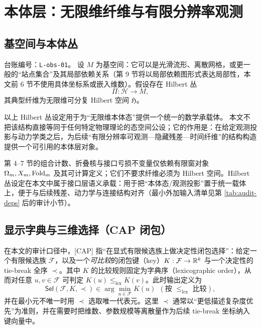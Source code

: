 \section{本体层：无限维纤维与有限分辨率观测}

\subsection{基空间与本体丛}

\begin{assumption}\label{ass:hilbert_bundle}
\InterfaceTag
\AuditTag 台账编号：\texttt{L-obs-01}。
设 $M$ 为基空间：它可以是光滑流形、离散网格，或更一般的“站点集合”及其局部依赖关系（第 9 节将以局部依赖图形式表达局部性，本文前 6 节不使用具体坐标系或嵌入维数）。假设存在 Hilbert 丛
$$
\Pi:\mathcal H\to M,
$$
其典型纤维为无限维可分复 Hilbert 空间 $\mathfrak H$。\cite{kato_hilbert_bundles}
\end{assumption}

\begin{remark}
\InterfaceTag 以上 Hilbert 丛设定用于为“无限维本体态”提供一个统一的数学承载体。
\AuditTag 本文不把该结构直接等同于任何特定物理理论的态空间公设；它的作用是：在给定观测投影与动力学类之后，为后续“有限分辨率可观测—隐藏残差—时间纤维”的结构构造提供一个可引用的本体层对象。
\end{remark}

\begin{remark}\label{rem:minimal_input_hilbert_optional}
\AuditTag
第 4--7 节的组合计数、折叠核与接口亏损不变量仅依赖有限窗对象 $\Omega_m,X_m,\mathrm{Fold}_m$ 及其可计算定义；它们不要求纤维必须为 Hilbert 空间。Hilbert 丛设定在本文中属于接口层语义承载：用于把“本体态/观测投影”置于统一载体上，便于与后续残差、动力学与连接结构对齐（最小外加输入清单见第 \ref{tab:audit-deps} 后的审计小节）。
\end{remark}

\subsection{显示字典与三维选择（CAP 闭包）}

\begin{definition}\label{def:cap_closure}
\AuditTag
在本文的审计口径中，\textsf{[CAP]} 指“在显式有限候选族上做决定性闭包选择”：给定一个有限候选族 $\mathcal F$，以及一个\emph{可比较}的闭包键（key）$K:\mathcal F\to \mathbb{R}^k$ 与一个决定性的 tie-break 全序 $\prec$。其中 $K$ 的比较规则固定为字典序（lexicographic order），从而对任意 $u,v\in\mathcal F$ 可判定 $K(u)\le_{\mathrm{lex}} K(v)$。此时输出定义为
$$
\mathsf{Sel}(\mathcal F,K,\prec)\in\arg\min_{u\in\mathcal F} K(u)\ \ (\text{按 } \le_{\mathrm{lex}} \text{ 比较}),
$$
并在最小元不唯一时用 $\prec$ 选取唯一代表元。这里 $\prec$ 通常以“更低描述复杂度优先”为准则，并在需要时把维数、参数规模等离散量作为后续 tie-break 坐标纳入键向量中。
\end{definition}

